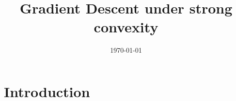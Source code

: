 \documentclass{beamer}
\title{Gradient Descent under strong convexity}
\date{\today}
\begin{document}
\maketitle
\frame{\tableofcontents}

\section{Introduction}%
\end{document}
